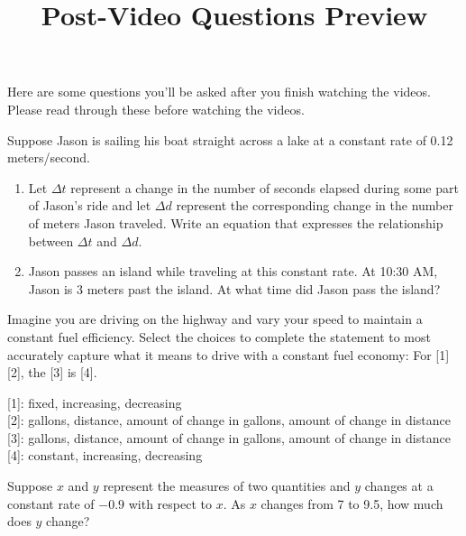 \documentclass[handout]{ximera}
\title{Post-Video Questions Preview}
\begin{document}
\begin{abstract}
\end{abstract}


\maketitle

Here are some questions you’ll be asked after you finish watching the videos. Please read through these before watching the videos.

\begin{problem}
Suppose Jason is sailing his boat straight across a lake at a constant rate of 0.12 meters/second.

\begin{enumerate}
\item Let $\Delta t$ represent a change in the number of seconds elapsed during some part of Jason’s ride and let $\Delta d$ represent the corresponding change in the number of meters Jason traveled. Write an equation that expresses the relationship between $\Delta t$ and $\Delta d$.
\item Jason passes an island while traveling at this constant rate. At 10:30 AM, Jason is 3 meters past the island. At what time did Jason pass the island?
\end{enumerate}
\end{problem}

\begin{problem}
Imagine you are driving on the highway and vary your speed to maintain a constant fuel efficiency. Select the choices to complete the statement to most accurately capture what it means to drive with a constant fuel economy:
For [1] [2], the [3] is [4].

[1]: fixed, increasing, decreasing\\

[2]: gallons, distance, amount of change in gallons, amount of change in distance\\

[3]: gallons, distance, amount of change in gallons, amount of change in distance\\

[4]: constant, increasing, decreasing\\

\end{problem}

\begin{problem}
Suppose $x$ and $y$ represent the measures of two quantities and $y$ changes at a constant rate of $-0.9$ with respect to $x$. As $x$ changes from 7 to 9.5, how much does $y$ change?
\end{problem}
\end{document}

